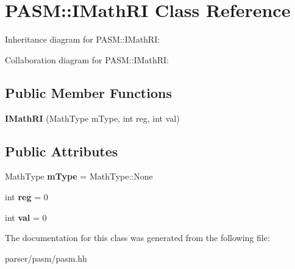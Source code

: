 \hypertarget{classPASM_1_1IMathRI}{}\section{P\+A\+SM\+:\+:I\+Math\+RI Class Reference}
\label{classPASM_1_1IMathRI}


Inheritance diagram for P\+A\+SM\+:\+:I\+Math\+RI\+:


Collaboration diagram for P\+A\+SM\+:\+:I\+Math\+RI\+:
\subsection*{Public Member Functions}
\begin{DoxyCompactItemize}
\item 
\mbox{\label{classPASM_1_1IMathRI_a1d0add42b6a7923f10212e83d1991c8b}} 
{\bfseries I\+Math\+RI} (Math\+Type m\+Type, int reg, int val)
\end{DoxyCompactItemize}
\subsection*{Public Attributes}
\begin{DoxyCompactItemize}
\item 
\mbox{\label{classPASM_1_1IMathRI_aa5b1f41a3f046d2b84a605b0e4488e9a}} 
Math\+Type {\bfseries m\+Type} = Math\+Type\+::\+None
\item 
\mbox{\label{classPASM_1_1IMathRI_a2947107af30c9477e05014595e9a4981}} 
int {\bfseries reg} = 0
\item 
\mbox{\label{classPASM_1_1IMathRI_a10659a283c3b59355dc1d12456f44692}} 
int {\bfseries val} = 0
\end{DoxyCompactItemize}


The documentation for this class was generated from the following file\+:\begin{DoxyCompactItemize}
\item 
parser/pasm/pasm.\+hh\end{DoxyCompactItemize}
